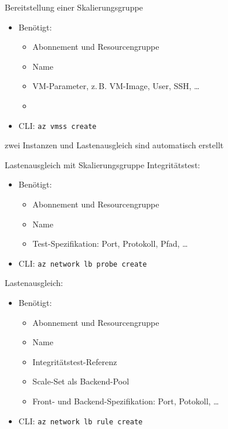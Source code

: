 \begin{flashcard}[Definition]{Bereitstellung einer Skalierungsgruppe}
    \begin{itemize}
        \item Benötigt:
            \begin{itemize}
                \item Abonnement und Resourcengruppe
                \item Name
                \item VM-Parameter, z.\,B. VM-Image, User, SSH, \ldots
                \item
            \end{itemize}
        \item CLI: \texttt{az vmss create}
    \end{itemize}
    zwei Instanzen und Lastenausgleich sind automatisch erstellt
\end{flashcard}

\begin{flashcard}[Definition]{Lastenausgleich mit Skalierungsgruppe}
    Integritätstest:
    \begin{itemize}
        \item Benötigt:
        \begin{itemize}
            \item Abonnement und Resourcengruppe
            \item Name
            \item Test-Spezifikation: Port, Protokoll, Pfad, \ldots
        \end{itemize}
        \item CLI: \texttt{az network lb probe create}
    \end{itemize}
    Lastenausgleich:
    \begin{itemize}
        \item Benötigt:
        \begin{itemize}
            \item Abonnement und Resourcengruppe
            \item Name
            \item Integritätstest-Referenz
            \item Scale-Set als Backend-Pool
            \item Front- und Backend-Spezifikation: Port, Potokoll, \ldots
        \end{itemize}
        \item CLI: \texttt{az network lb rule create}
    \end{itemize}
\end{flashcard}

